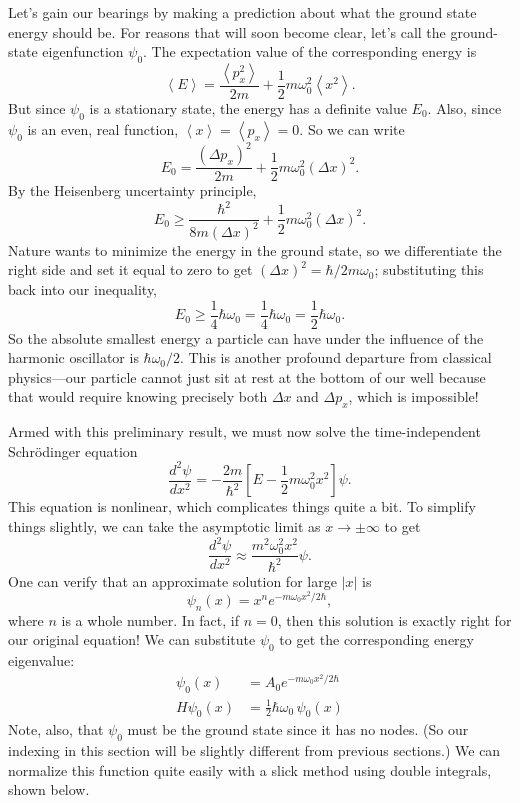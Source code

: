 \documentclass[../p052main.tex]{subfiles}
\begin{document}
Let's gain our bearings by making a prediction about what the ground state energy should be.
For reasons that will soon become clear, let's call the ground-state eigenfunction $\psi_0$.
The expectation value of the corresponding energy is
\[ \left< E \right> = \frac{\left< p_x^2 \right>}{2m} + \frac{1}{2}m\omega_0^2 \left< x^2 \right>. \]
But since $\psi_0$ is a stationary state, the energy has a definite value $E_0$.
Also, since $\psi_0$ is an even, real function, $\left< x \right> = \left< p_x \right> = 0$.
So we can write
\[ E_0 = \frac{(\Delta p_x)^2}{2m} + \frac{1}{2}m\omega_0^2 (\Delta x)^2. \]
By the Heisenberg uncertainty principle,
\[ E_0 \geq \frac{\hbar^2}{8m (\Delta x)^2} + \frac{1}{2} m\omega_0^2 (\Delta x)^2. \]
Nature wants to minimize the energy in the ground state, so we differentiate the right side and set it equal to zero to get $(\Delta x)^2 = \hbar / 2m\omega_0$; substituting this back into our inequality,
\[ E_0 \geq \frac{1}{4} \hbar \omega_0 = \frac{1}{4} \hbar \omega_0 = \frac{1}{2} \hbar \omega_0. \]
So the absolute smallest energy a particle can have under the influence of the harmonic oscillator is $\hbar \omega_0 / 2$.
This is another profound departure from classical physics---our particle cannot just sit at rest at the bottom of our well because that would require knowing precisely both $\Delta x$ and $\Delta p_x$, which is impossible!

Armed with this preliminary result, we must now solve the time-independent Schrödinger equation
\[ \frac{d^2 \psi}{d x^2} = -\frac{2m}{\hbar^2} \left[ E - \frac{1}{2}m\omega_0^2x^2 \right] \psi. \]
This equation is nonlinear, which complicates things quite a bit.
To simplify things slightly, we can take the asymptotic limit as $x \to \pm \infty$ to get
\[ \frac{d^2 \psi}{d x^2} \approx \frac{m^2\omega_0^2x^2}{\hbar^2} \psi. \]
One can verify that an approximate solution for large $|x|$ is
\[ \psi_n(x) = x^{n} e^{-m\omega_0 x^2 / 2\hbar}, \]
where $n$ is a whole number.
In fact, if $n=0$, then this solution is exactly right for our original equation!
We can substitute $\psi_0$ to get the corresponding energy eigenvalue:
\begin{align*}
    \psi_0(x) &= A_0e^{-m\omega_0 x^2 / 2\hbar} \\
    H \psi_0(x) &= \frac{1}{2}\hbar\omega_0 \,\psi_0(x)
\end{align*}
Note, also, that $\psi_0$ must be the ground state since it has no nodes.
(So our indexing in this section will be slightly different from previous sections.)
We can normalize this function quite easily with a slick method using double integrals, shown below.
\end{document}
